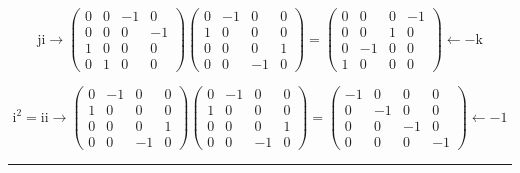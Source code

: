 \documentclass[
]{book}
\theoremstyle{definition}
\theoremstyle{definition}
\theoremstyle{definition}
\theoremstyle{definition}
\theoremstyle{remark}
\begin{document}
\[
\mathrm{j}\mathrm{i}\rightarrow\begin{pmatrix}0 & 0 & -1 & 0\\
0 & 0 & 0 & -1\\
1 & 0 & 0 & 0\\
0 & 1 & 0 & 0
\end{pmatrix}\begin{pmatrix}0 & -1 & 0 & 0\\
1 & 0 & 0 & 0\\
0 & 0 & 0 & 1\\
0 & 0 & -1 & 0
\end{pmatrix}=\begin{pmatrix}0 & 0 & 0 & -1\\
0 & 0 & 1 & 0\\
0 & -1 & 0 & 0\\
1 & 0 & 0 & 0
\end{pmatrix}\leftarrow-\mathrm{k}
\]

\[
\mathrm{i}^{2}=\mathrm{i}\mathrm{i}\rightarrow\begin{pmatrix}0 & -1 & 0 & 0\\
1 & 0 & 0 & 0\\
0 & 0 & 0 & 1\\
0 & 0 & -1 & 0
\end{pmatrix}\begin{pmatrix}0 & -1 & 0 & 0\\
1 & 0 & 0 & 0\\
0 & 0 & 0 & 1\\
0 & 0 & -1 & 0
\end{pmatrix}=\begin{pmatrix}-1 & 0 & 0 & 0\\
0 & -1 & 0 & 0\\
0 & 0 & -1 & 0\\
0 & 0 & 0 & -1
\end{pmatrix}\leftarrow-1
\]

\begin{center}\rule{0.5\linewidth}{0.5pt}\end{center}
\end{document}
